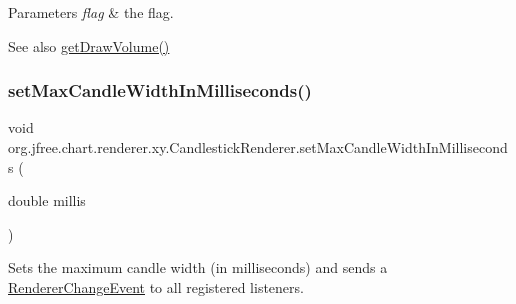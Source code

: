 \begin{DoxyParams}{Parameters}
{\em flag} & the flag.\\
\hline
\end{DoxyParams}
\begin{DoxySeeAlso}{See also}
\mbox{\hyperlink{classorg_1_1jfree_1_1chart_1_1renderer_1_1xy_1_1_candlestick_renderer_a031b1f856f7ef71b3ec51e52604c9dfe}{get\+Draw\+Volume()}} 
\end{DoxySeeAlso}
\mbox{\label{classorg_1_1jfree_1_1chart_1_1renderer_1_1xy_1_1_candlestick_renderer_a7f28bced2a25bf012d05127ac175af49}} 
\subsubsection{\texorpdfstring{set\+Max\+Candle\+Width\+In\+Milliseconds()}{setMaxCandleWidthInMilliseconds()}}
{\footnotesize\ttfamily void org.\+jfree.\+chart.\+renderer.\+xy.\+Candlestick\+Renderer.\+set\+Max\+Candle\+Width\+In\+Milliseconds (\begin{DoxyParamCaption}\item[{double}]{millis }\end{DoxyParamCaption})}

Sets the maximum candle width (in milliseconds) and sends a \mbox{\hyperlink{}{Renderer\+Change\+Event}} to all registered listeners.


